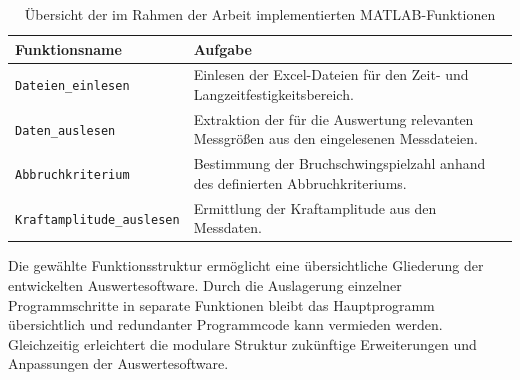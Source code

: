 \begin{table}[H]
    \centering
    \caption{Übersicht der im Rahmen der Arbeit implementierten MATLAB-Funktionen}
    \label{tab:funktionsuebersicht}

    \begin{tabular}{|p{5.7cm}|p{8.5cm}|}
        \hline
        \textbf{Funktionsname} & \textbf{Aufgabe} \\
        \hline

        \texttt{Dateien\_einlesen} &
        Einlesen der Excel-Dateien für den Zeit- und Langzeitfestigkeitsbereich. \\
        \hline

        \texttt{Daten\_auslesen} &
        Extraktion der für die Auswertung relevanten Messgrößen aus den eingelesenen Messdateien. \\
        \hline
        
         \texttt{Abbruchkriterium} &
        Bestimmung der Bruchschwingspielzahl anhand des definierten Abbruchkriteriums. \\
        \hline

        \texttt{Kraftamplitude\_auslesen} &
        Ermittlung der Kraftamplitude aus den Messdaten. \\
        \hline


    \end{tabular}
\end{table}

Die gewählte Funktionsstruktur ermöglicht eine übersichtliche Gliederung der entwickelten Auswertesoftware. Durch die Auslagerung einzelner Programmschritte in separate Funktionen bleibt das Hauptprogramm übersichtlich und redundanter Programmcode kann vermieden werden. Gleichzeitig erleichtert die modulare Struktur zukünftige Erweiterungen und Anpassungen der Auswertesoftware.

\clearpage


